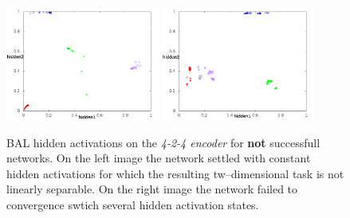 \begin{figure}[H]
  \centering
  \includegraphics[width=0.45\textwidth]{../presentation/img/tazisko.png}   
  \includegraphics[width=0.45\textwidth]{../presentation/img/non-convergent.png}    
  \caption{BAL hidden activations on the \emph{4-2-4 encoder} for {\bf not} successfull networks. On the left image the network settled with constant hidden activations for which the resulting tw--dimensional task is not linearly separable. On the right image the network failed to convergence swtich several hidden activation states.}
  \label{fig:results-hidden-activations-bal-bad}
\end{figure}
